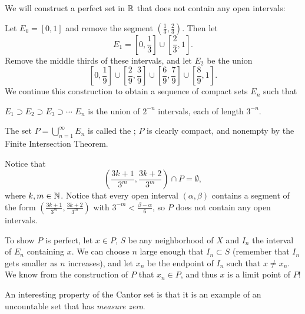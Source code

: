 \documentclass{article}
\begin{document}
\begin{example}
    We will construct a perfect set in $\mathbb R$ that does not contain any open intervals:
    \begin{enumerate}
        \ii Let $E_{0}=[0,1]$ and remove the segment $(\frac{1}{3},\frac{2}{3})$. Then let \[E_{1}=\left[0,\frac{1}{3}\right]\cup\left[\frac{2}{3},1\right].\]
        \ii Remove the middle thirds of these intervals, and let $E_{2}$ be the union 
        \[\left[0,\frac{1}{9}\right]\cup\left[\frac{2}{9},\frac{3}{9}\right]\cup\left[\frac{6}{9},\frac{7}{9}\right]\cup\left[\frac{8}{9},1\right].\]
        \ii We continue this construction to obtain a sequence of compact sets $E_{n}$ such that 
        \begin{enumerate}
            \ii $E_{1}\supset E_{2}\supset E_{3}\supset \dotsi$
            \ii $E_{n}$ is the union of $2^{-n}$ intervals, each of length $3^{-n}$.
        \end{enumerate}
    \end{enumerate}
    The set $P=\bigcup_{n=1}^{\infty}E_{n}$ is called the ; $P$ is clearly compact, and nonempty by the Finite Intersection Theorem.
    \begin{itemize}
    \ii Notice that 
    \[\left(\frac{3k+1}{3^{m}},\frac{3k+2}{3^{m}}\right)\cap P=\emptyset,\]where $k,m\in\mathbb N$. Notice that every open interval $(\alpha,\beta)$ contains a segment of the form $\left(\frac{3k+1}{3^{m}},\frac{3k+2}{3^{m}}\right)$ with $3^{-m}<\frac{\beta-\alpha}{6}$, so $P$ does not contain any open intervals.

    \ii To show $P$ is perfect, let $x\in P$, $S$ be any neighborhood of $X$ and $I_{n}$ the interval of $E_{n}$ containing $x$. We can choose $n$ large enough that $I_{n}\subset S$ (remember that $I_{n}$ gets smaller as $n$ increases), and let $x_{n}$ be the endpoint of $I_{n}$ such that $x\neq x_{n}$. We know from the construction of $P$ that $x_{n}\in P$, and thus $x$ is a limit point of $P$! 
    \end{itemize}
    An interesting property of the Cantor set is that it is an example of an uncountable set that has \textit{measure zero}.
\end{example}
\end{document}
